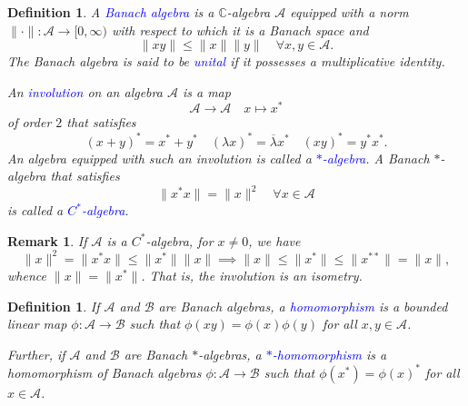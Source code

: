 \documentclass[11pt]{article}
\theoremstyle{thmstyle}
\theoremstyle{defstyle}
\newtheorem{definition}[theorem]{Definition}
\newtheorem{remark}[theorem]{Remark}
\newcommand{\bbC}{\mathbb{C}}
\newcommand{\calA}{\mathcal{A}} %
\newcommand{\calB}{\mathcal{B}} %
\newcommand{\define}[1]{\textcolor{blue}{\textit{#1}}}
\renewcommand{\le}{\leqslant}
\begin{document}
\begin{definition}
    A \define{Banach algebra} is a $\bbC$-algebra $\calA$ equipped with a norm $\|\cdot\|:\calA\to[0,\infty)$ with respect to which it is a Banach space and 
    \begin{equation*}
        \|xy\|\le\|x\|\|y\|\quad\forall x,y\in\calA.
    \end{equation*}
    The Banach algebra is said to be \define{unital} if it possesses a multiplicative identity.

    An \define{involution} on an algebra $\calA$ is a map 
    \begin{equation*}
        \calA\to\calA\quad x\mapsto x^\ast
    \end{equation*}
    of order $2$ that satisfies 
    \begin{equation*}
        (x + y)^\ast = x^\ast + y^\ast\quad(\lambda x)^\ast = \overline\lambda x^\ast\quad (xy)^\ast = y^\ast x^\ast.
    \end{equation*}
    An algebra equipped with such an involution is called a \define{$\ast$-algebra}. A Banach $\ast$-algebra that satisfies 
    \begin{equation*}
        \|x^\ast x\| = \|x\|^2 \quad \forall x\in\calA
    \end{equation*}
    is called a \define{$C^\ast$-algebra}.
\end{definition}

\begin{remark}
    If $\calA$ is a $C^\ast$-algebra, for $x\ne 0$, we have 
    \begin{equation*}
        \|x\|^2 = \|x^\ast x\|\le\|x^\ast\|\|x\|\implies\|x\|\le\|x^\ast\|\le\|x^{\ast\ast}\| = \|x\|,
    \end{equation*}
    whence $\|x\| = \|x^\ast\|$. That is, the involution is an isometry.
\end{remark}

\begin{definition}
    If $\calA$ and $\calB$ are Banach algebras, a \define{homomorphism} is a bounded linear map $\phi:\calA\to\calB$ such that $\phi(xy) = \phi(x)\phi(y)$ for all $x,y\in\calA$.

    Further, if $\calA$ and $\calB$ are Banach $\ast$-algebras, a \define{$\ast$-homomorphism} is a homomorphism of Banach algebras $\phi:\calA\to\calB$ such that $\phi(x^\ast) = \phi(x)^\ast$ for all $x\in\calA$.
\end{definition}
\end{document}
